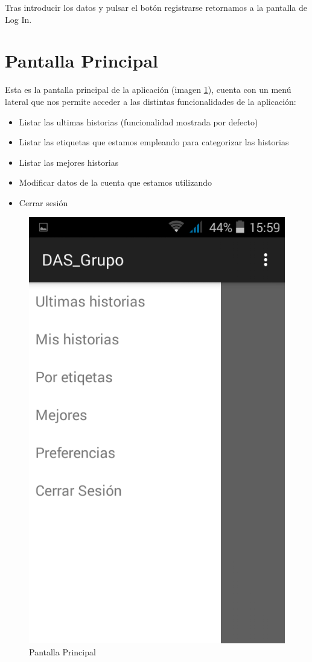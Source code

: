 \documentclass[11pt,a4paper, titlepage]{article}
\begin{document}
Tras introducir los datos y pulsar el botón registrarse retornamos a la pantalla de Log In.
	
	\FloatBarrier
	\section[Pantalla Principal]{Pantalla Principal}
	\label{inPrin}
	
	Esta es la pantalla principal de la aplicación (imagen \ref{p1}), cuenta con un menú lateral que nos permite acceder a las distintas funcionalidades de la aplicación:
	
	\begin{itemize}
		\item Listar las ultimas historias (funcionalidad mostrada por defecto)
		\item Listar las etiquetas que estamos empleando para categorizar las historias
		\item Listar las mejores historias
		\item Modificar datos de la cuenta que estamos utilizando
		\item Cerrar sesión
	\end{itemize}
	
	\begin{figure}[hbtp]
		\centering
		\includegraphics[scale = 0.25 ]{img/3}
		\caption{Pantalla Principal}
		\label{p1}
	\end{figure}
	
\end{document}
